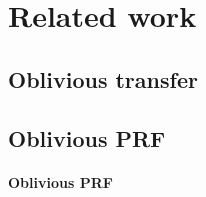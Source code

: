 \section{Related work}
\label{sect:relwork}

\subsection{Oblivious transfer}

%


\subsection{Oblivious PRF}
\paragraph{Oblivious PRF} 

%


